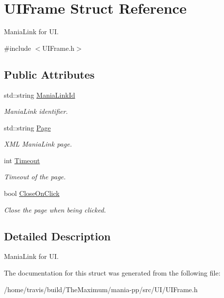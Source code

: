 \hypertarget{structUIFrame}{\section{U\-I\-Frame Struct Reference}
\label{structUIFrame}
}


Mania\-Link for U\-I.  




{\ttfamily \#include $<$U\-I\-Frame.\-h$>$}

\subsection*{Public Attributes}
\begin{DoxyCompactItemize}
\item 
\hypertarget{structUIFrame_a19acdca83f6f8e83337ee9cbc9af3d29}{std\-::string \hyperlink{structUIFrame_a19acdca83f6f8e83337ee9cbc9af3d29}{Mania\-Link\-Id}}\label{structUIFrame_a19acdca83f6f8e83337ee9cbc9af3d29}

\begin{DoxyCompactList}\small\item\em Mania\-Link identifier. \end{DoxyCompactList}\item 
\hypertarget{structUIFrame_a54d853cff6d85507611f0d43a4956ff9}{std\-::string \hyperlink{structUIFrame_a54d853cff6d85507611f0d43a4956ff9}{Page}}\label{structUIFrame_a54d853cff6d85507611f0d43a4956ff9}

\begin{DoxyCompactList}\small\item\em X\-M\-L Mania\-Link page. \end{DoxyCompactList}\item 
\hypertarget{structUIFrame_a5f0ee21f4abbec9a745a2a601e03cd8d}{int \hyperlink{structUIFrame_a5f0ee21f4abbec9a745a2a601e03cd8d}{Timeout}}\label{structUIFrame_a5f0ee21f4abbec9a745a2a601e03cd8d}

\begin{DoxyCompactList}\small\item\em Timeout of the page. \end{DoxyCompactList}\item 
\hypertarget{structUIFrame_a96c8c5d8129595ee565039a84a928ae7}{bool \hyperlink{structUIFrame_a96c8c5d8129595ee565039a84a928ae7}{Close\-On\-Click}}\label{structUIFrame_a96c8c5d8129595ee565039a84a928ae7}

\begin{DoxyCompactList}\small\item\em Close the page when being clicked. \end{DoxyCompactList}\end{DoxyCompactItemize}


\subsection{Detailed Description}
Mania\-Link for U\-I. 

The documentation for this struct was generated from the following file\-:\begin{DoxyCompactItemize}
\item 
/home/travis/build/\-The\-Maximum/mania-\/pp/src/\-U\-I/U\-I\-Frame.\-h\end{DoxyCompactItemize}
